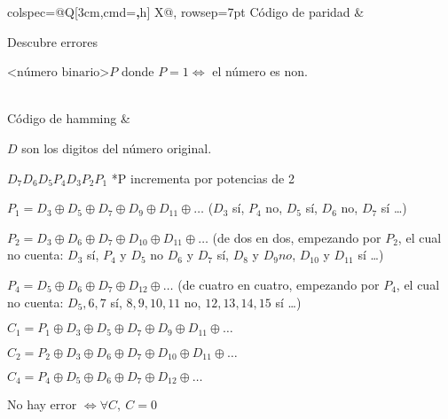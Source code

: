 \documentclass[letterpaper]{article}
\def \T{Sistemas Digitales}
\def \S{Código de paridad}
\begin{document}


\begin{longtblr}{
    colspec={@{}Q[3cm,cmd=\textbf,h] X@{}},
    rowsep={7pt}
  }
  Código de paridad
  & \begin{minipage}{\linewidth}
  Descubre errores
  \medskip

  $\text{<número binario>}P$ donde $P = 1 \iff$ el número es non.

  \end{minipage}
  \\
  Código de hamming
  & \begin{minipage}{\linewidth}
    $D$ son los digitos del número original.

    $
    D_7
    D_6
    D_5
    P_4
    D_3
    P_2
    P_1
    $ *P incrementa por potencias de 2
    \medskip

    $
    P_1 = 
    D_3 \oplus
    D_5 \oplus
    D_7 \oplus
    D_9 \oplus
    D_{11} \oplus
    \dots
    $ 
    ($D_3$ sí, $P_4$ no, $D_5$ sí, $D_6$ no, $D_7$ sí \dots)
    \medskip

    $
    P_2 = 
    D_3 \oplus
    D_6 \oplus
    D_7 \oplus
    D_{10} \oplus
    D_{11} \oplus
    \dots
    $
    (de dos en dos, empezando por $P_2$, el cual no cuenta: $D_3$ sí, $P_4$ y $D_5$ no $D_6$ y $D_7$ sí, $D_8$ y $D_9 no$, $D_{10}$ y $D_{11}$ sí \dots)
    \medskip

    $
    P_4 = 
    D_5 \oplus
    D_6 \oplus
    D_7 \oplus
    D_{12} \oplus
    \dots
    $
    (de cuatro en cuatro, empezando por $P_4$, el cual no cuenta: $D_5, 6, 7$ sí, $8,9,10,11$ no, $12,13,14,15$ sí \dots)
    \medskip

    $
    C_1 = 
    P_1 \oplus
    D_3 \oplus
    D_5 \oplus
    D_7 \oplus
    D_9 \oplus
    D_{11} \oplus
    \dots
    $ 
    \medskip

    $
    C_2 = 
    P_2 \oplus
    D_3 \oplus
    D_6 \oplus
    D_7 \oplus
    D_{10} \oplus
    D_{11} \oplus
    \dots
    $
    \medskip

    $
    C_4 = 
    P_4 \oplus
    D_5 \oplus
    D_6 \oplus
    D_7 \oplus
    D_{12} \oplus
    \dots
    $
    \medskip

    No hay error $\iff \forall C,~ C=0$
  \end{minipage}
\end{longtblr}


 
\end{document}
